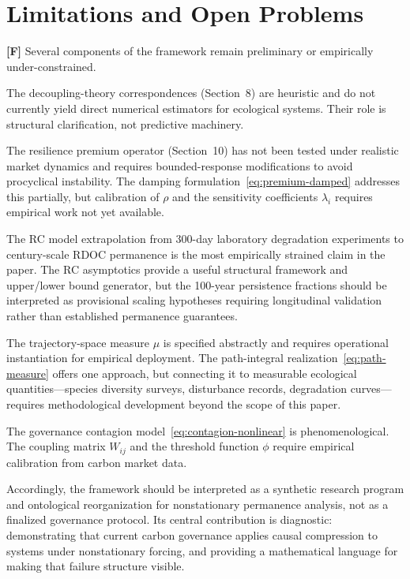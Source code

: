 \documentclass[12pt]{article}
\begin{document}
\section{Limitations and Open Problems}

\textbf{[F]} Several components of the framework remain preliminary or empirically
under-constrained.

The decoupling-theory correspondences (Section~8) are heuristic and do not currently
yield direct numerical estimators for ecological systems. Their role is structural
clarification, not predictive machinery.

The resilience premium operator (Section~10) has not been tested under realistic market
dynamics and requires bounded-response modifications to avoid procyclical instability.
The damping formulation~\eqref{eq:premium-damped} addresses this partially, but
calibration of $\rho$ and the sensitivity coefficients $\lambda_i$ requires empirical
work not yet available.

The RC model extrapolation from 300-day laboratory degradation experiments to
century-scale RDOC permanence is the most empirically strained claim in the paper.
The RC asymptotics provide a useful structural framework and upper/lower bound generator,
but the 100-year persistence fractions should be interpreted as provisional scaling
hypotheses requiring longitudinal validation rather than established permanence guarantees.

The trajectory-space measure $\mu$ is specified abstractly and requires operational
instantiation for empirical deployment. The path-integral realization~\eqref{eq:path-measure}
offers one approach, but connecting it to measurable ecological quantities---species
diversity surveys, disturbance records, degradation curves---requires methodological
development beyond the scope of this paper.

The governance contagion model~\eqref{eq:contagion-nonlinear} is phenomenological. The
coupling matrix $W_{ij}$ and the threshold function $\phi$ require empirical calibration
from carbon market data.

Accordingly, the framework should be interpreted as a synthetic research program and
ontological reorganization for nonstationary permanence analysis, not as a finalized
governance protocol. Its central contribution is diagnostic: demonstrating that current
carbon governance applies causal compression to systems under nonstationary forcing,
and providing a mathematical language for making that failure structure visible.
\end{document}
